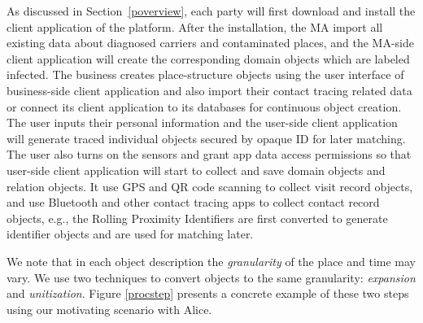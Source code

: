 \documentclass[11pt]{article}  %
\begin{document}



As discussed in Section~\ref{poverview}, each party will first download and install the client application of the platform. After the installation, the MA import all existing data about diagnosed carriers and contaminated places, and the MA-side client application will create the corresponding domain objects which are labeled infected. The business creates place-structure objects using the user interface of business-side client application and also import their contact tracing related data or connect its client application to its databases for continuous object creation. The user inputs their personal information and the user-side client application will generate traced individual objects secured by opaque ID for later matching. The user also turns on the sensors and grant app data access permissions so that user-side client application will start to collect and save domain objects and relation objects. It use GPS and QR code scanning to collect visit record objects, and use Bluetooth and other contact tracing apps to collect contact record objects, e.g., the Rolling Proximity Identifiers are first converted to generate identifier objects and are used for matching later.

We note that in each object description the \emph{granularity} of the place and time may vary. 
We use two techniques to convert objects to the same granularity: \emph{expansion} and \emph{unitization}. Figure \ref{procstep} presents a concrete example of these two steps using our motivating scenario with Alice. 
\end{document}
